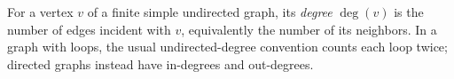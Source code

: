 
For a vertex $v$ of a finite simple undirected graph, its \emph{degree} $\deg(v)$ is the number of edges incident with $v$, equivalently the number of its neighbors. In a graph with loops, the usual undirected-degree convention counts each loop twice; directed graphs instead have in-degrees and out-degrees.
